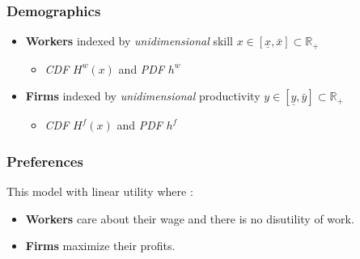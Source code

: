 \documentclass[12pt]{article}
\theoremstyle{definition}
\begin{document}
\subsubsection{Demographics}
\begin{itemize}
    \item  \textbf{Workers} indexed by \textit{unidimensional} skill $x\in[\underline{x},  \bar{x} ]\subset \mathbb{R}_+$
    \begin{itemize}
        \item  \textit{CDF} $H^w(x)$ and \textit{PDF} $h^w$  
    \end{itemize}
    \item  \textbf{Firms} indexed by \textit{unidimensional} productivity $y\in[\underline{y},  \bar{y} ]\subset \mathbb{R}_+$
    \begin{itemize}
        \item \textit{CDF} $H^f(x)$ and \textit{PDF} $h^f$  
    \end{itemize}
\end{itemize}

\subsubsection{Preferences}
This model with linear utility where :
\begin{itemize}
    \item \textbf{Workers} care about their wage and there is no disutility of work.
    \item  \textbf{Firms} maximize their profits.
\end{itemize}
\end{document}
